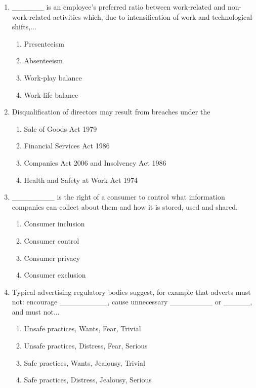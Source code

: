 \documentclass[12pt]{article}
\begin{document}
\begin{enumerate}[label=\arabic*.]
\begin{enumerate}[label=(\alph*)]
    \item Moral originality
    \item Moral reflexivity
\end{enumerate}
\item \_\_\_\_\_\_ is an employee's preferred ratio between work-related and non-work-related activities which, due to intensification of work and technological shifts,...
\begin{enumerate}[label=(\alph*)]
    \item Presenteeism
    \item Absenteeism
    \item Work-play balance
    \item Work-life balance
\end{enumerate}
\item Disqualification of directors may result from breaches under the
\begin{enumerate}[label=(\alph*)]
    \item Sale of Goods Act 1979
    \item Financial Services Act 1986
    \item Companies Act 2006 and Insolvency Act 1986
    \item Health and Safety at Work Act 1974
\end{enumerate}
\item \_\_\_\_\_\_\_\_ is the right of a consumer to control what information companies can collect about them and how it is stored, used and shared.
\begin{enumerate}[label=(\alph*)]
    \item Consumer inclusion
    \item Consumer control
    \item Consumer privacy
    \item Consumer exclusion
\end{enumerate}
\item Typical advertising regulatory bodies suggest, for example that adverts must not: encourage \_\_\_\_\_\_\_\_\_, cause unnecessary \_\_\_\_\_\_\_\_ or \_\_\_\_\_, and must not...
\begin{enumerate}[label=(\alph*)]
    \item Unsafe practices, Wants, Fear, Trivial
    \item Unsafe practices, Distress, Fear, Serious
    \item Safe practices, Wants, Jealousy, Trivial
    \item Safe practices, Distress, Jealousy, Serious

\end{enumerate}
\end{enumerate}
\end{document}
